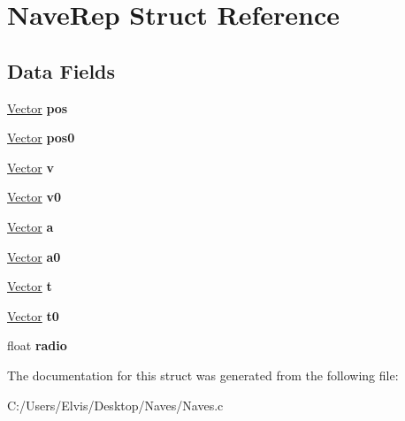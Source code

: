 \hypertarget{struct_nave_rep}{}\section{Nave\+Rep Struct Reference}
\label{struct_nave_rep}
\subsection*{Data Fields}
\begin{DoxyCompactItemize}
\item 
\hyperlink{struct_vector_rep}{Vector} {\bfseries pos}\hypertarget{struct_nave_rep_ae19a907bc741ffa358691997cd93774b}{}\label{struct_nave_rep_ae19a907bc741ffa358691997cd93774b}

\item 
\hyperlink{struct_vector_rep}{Vector} {\bfseries pos0}\hypertarget{struct_nave_rep_a4b034bcede31c0baf08f567b758cc47f}{}\label{struct_nave_rep_a4b034bcede31c0baf08f567b758cc47f}

\item 
\hyperlink{struct_vector_rep}{Vector} {\bfseries v}\hypertarget{struct_nave_rep_a73d58401a7a8cae61b1e4fca09a9c21e}{}\label{struct_nave_rep_a73d58401a7a8cae61b1e4fca09a9c21e}

\item 
\hyperlink{struct_vector_rep}{Vector} {\bfseries v0}\hypertarget{struct_nave_rep_a338e967b670a019d7ce29111df4b57f8}{}\label{struct_nave_rep_a338e967b670a019d7ce29111df4b57f8}

\item 
\hyperlink{struct_vector_rep}{Vector} {\bfseries a}\hypertarget{struct_nave_rep_a5955b5e71d8d50c4184e6747df745ce0}{}\label{struct_nave_rep_a5955b5e71d8d50c4184e6747df745ce0}

\item 
\hyperlink{struct_vector_rep}{Vector} {\bfseries a0}\hypertarget{struct_nave_rep_a81990c3c34011378f1de6944b6fea3ba}{}\label{struct_nave_rep_a81990c3c34011378f1de6944b6fea3ba}

\item 
\hyperlink{struct_vector_rep}{Vector} {\bfseries t}\hypertarget{struct_nave_rep_a89da70e90b8fa7537891cfd63d740144}{}\label{struct_nave_rep_a89da70e90b8fa7537891cfd63d740144}

\item 
\hyperlink{struct_vector_rep}{Vector} {\bfseries t0}\hypertarget{struct_nave_rep_ac87b30b1851dc06c5e5f1b4a3a109a7b}{}\label{struct_nave_rep_ac87b30b1851dc06c5e5f1b4a3a109a7b}

\item 
float {\bfseries radio}\hypertarget{struct_nave_rep_a3c2ee6092698efb4326f4f9daa589180}{}\label{struct_nave_rep_a3c2ee6092698efb4326f4f9daa589180}

\end{DoxyCompactItemize}


The documentation for this struct was generated from the following file\+:\begin{DoxyCompactItemize}
\item 
C\+:/\+Users/\+Elvis/\+Desktop/\+Naves/Naves.\+c\end{DoxyCompactItemize}
